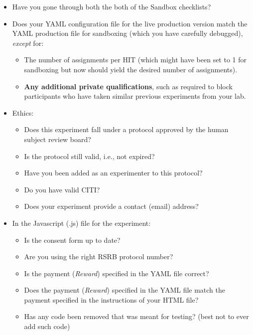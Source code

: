 \documentclass{article}
\begin{document}
\begin{tcolorbox}[colback=gray!5,colframe=blue!40!black,title=Final checklist]
\begin{itemize}
    \item Have you gone through both the both of the Sandbox checklists?
    \item Does your YAML configuration file for the live production version match the YAML production file for sandboxing (which you have carefully debugged), {\em except} for:
    \begin{itemize}
      \item The number of assignments per HIT (which might have been set to 1 for sandboxing but now should yield the desired number of assignments).
      \item \textbf{Any additional private qualifications}, such as required to block participants who have taken similar previous experiments from your lab.
    \end{itemize}
    \item Ethics:
    \begin{itemize}
        \item Does this experiment fall under a protocol approved by the human subject review board?
        \item Is the protocol still valid, i.e., not expired?
        \item Have you been added as an experimenter to this protocol?
        \item Do you have valid CITI?
        \item Does your experiment provide a contact (email) address?
    \end{itemize}
    \item In the Javascript (.js) file for the experiment:
    \begin{itemize}
        \item Is the consent form up to date?
        \item Are you using the right RSRB protocol number?
        \item Is the payment ({\em Reward}) specified in the YAML file correct?
        \item Does the payment ({\em Reward}) specified in the YAML file match the payment specified in the instructions of your HTML file?
        \item Has any code been removed that was meant for testing? (best not to ever add such code)
    \end{itemize}
\end{itemize}
\end{tcolorbox}
\end{document}

